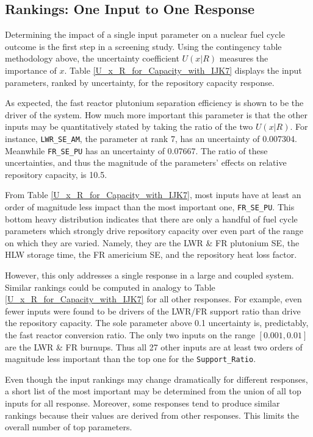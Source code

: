 \documentclass[preprint,12pt]{elsarticle}
\begin{document}
\subsection{Rankings: One Input to One Response}
\label{sec:rank2D}

Determining the impact of a single input parameter on a nuclear fuel cycle outcome is the first step in a screening study.  Using the contingency table methodology above,
the uncertainty coefficient $U(x|R)$ measures the importance of $x$.  Table \ref{U_x_R_for_Capacity_with_IJK7} displays the input parameters, ranked by
uncertainty, for the repository capacity response.

%


As expected, the fast reactor plutonium separation efficiency is shown to be the driver of the system.  How much more important this parameter is that the
other inputs may be quantitatively stated by taking the ratio of the two $U(x|R)$.  For instance, \texttt{LWR\_SE\_AM}, the parameter at rank 7,
has an uncertainty of 0.007304.  Meanwhile \texttt{FR\_SE\_PU} has an uncertainty of 0.07667.  The ratio of these uncertainties,
and thus the magnitude of the parameters' effects on relative repository capacity, is 10.5.

From Table \ref{U_x_R_for_Capacity_with_IJK7}, most inputs have at least an order of magnitude less impact than the most important one, \texttt{FR\_SE\_PU}.
This bottom heavy distribution indicates that there are only a handful of fuel cycle parameters which strongly drive
repository capacity over even part of the range on which they are varied.
Namely, they are the LWR \& FR plutonium SE, the HLW storage time, the FR americium SE, and the repository heat loss factor.

However, this only addresses a single response in a large and coupled system.
Similar rankings could be computed in analogy to Table \ref{U_x_R_for_Capacity_with_IJK7} for all other responses.
For example, even fewer inputs were found to be drivers of the LWR/FR support ratio than drive the repository capacity.  The sole parameter above 0.1 uncertainty is, predictably, the fast reactor conversion ratio.
The only two inputs on the range $[0.001, 0.01]$ are the LWR \& FR burnups.  Thus all 27 other inputs are at least two orders of magnitude
less important than the top one for the \texttt{Support\_Ratio}.

Even though the input rankings may change dramatically for different responses, a short list of the most important may be determined from the union of all top
inputs for all response.  Moreover, some responses tend to produce similar rankings because their values are derived from other responses.
This limits the overall number of top parameters.
\end{document}
